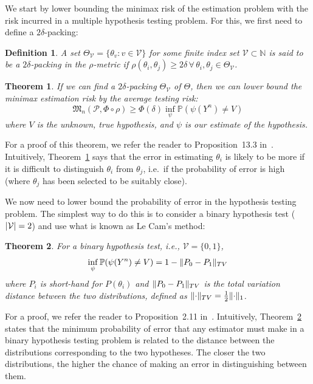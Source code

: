 \documentclass[conference]{IEEEtran}
\DeclarePairedDelimiter\abs{\lvert}{\rvert}
\DeclarePairedDelimiter\norm{\lVert}{\rVert}
\newcommand{\Phiorho}{\Phi\!\circ\!\rho}
\newtheorem{theorem}{Theorem}
\newtheorem{definition}{Definition}
\begin{document}
We start by lower bounding the minimax risk of the estimation problem with the
risk incurred in a multiple hypothesis testing problem. For this, we first need
to define a $2\delta$-packing:%
\begin{definition}
	A set $\Theta_{\mathcal{V}} = \{ \theta_v : v \in \mathcal{V} \}$ for some
	finite index set $\mathcal{V} \subset \mathbb N$ is said to be a
	$2\delta$-packing in the $\rho$-metric if $\rho(\theta_i, \theta_j) \geq
	2\delta \, \forall \, \theta_i, \theta_j \in \Theta_{\mathcal{V}}$.
\end{definition}
\begin{theorem} \label{thm:est-to-testing}%
	If we can find a $2\delta$-packing $\Theta_{\mathcal{V}}$ of $\Theta$, then
	we can lower bound the minimax estimation risk by the average testing risk:
	\begin{equation}
		\mathfrak{M}_n(\mathcal{P}, \Phiorho) \geq \Phi(\delta) \inf_\psi \mathbb P (\psi(Y^n) \neq V)
	\end{equation}
	where $V$ is the unknown, true hypothesis, and $\psi$ is our estimate of
	the hypothesis.
\end{theorem}
For a proof of this theorem, we refer the reader to Proposition~13.3
in~\cite{Duchi2015Information}.  Intuitively, Theorem~\ref{thm:est-to-testing}
says that the error in estimating $\theta_i$ is likely to be more if it is
difficult to distinguish $\theta_i$ from $\theta_j$, i.e.\ if the probability
of error is high (where $\theta_j$ has been selected to be suitably close).

We now need to lower bound the probability of error in the hypothesis testing
problem. The simplest way to do this is to consider a binary hypothesis test
($\abs{\mathcal{V}} = 2$) and use what is known as Le Cam's method:
\begin{theorem} \label{thm:le-cam}
	For a binary hypothesis test, i.e., $\mathcal{V} = \{0, 1\}$,
	\begin{equation}
		\inf_\psi \mathbb P(\psi(Y^n) \neq V) = 1 - \norm{P_0 - P_1}_{TV}
	\end{equation}
	where $P_i$ is short-hand for $P(\theta_i)$ and $\norm{P_0 - P_1}_{TV}$ is
	the total variation distance between the two distributions, defined as
	$\norm{\cdot}_{TV} = \frac{1}{2} \norm{\cdot}_1$.
\end{theorem}
For a proof, we refer the reader to Proposition~2.11
in~\cite{Duchi2015Information}.  Intuitively, Theorem~\ref{thm:le-cam} states
that the minimum probability of error that any estimator must make in a binary
hypothesis testing problem is related to the distance between the distributions
corresponding to the two hypotheses. The closer the two distributions, the
higher the chance of making an error in distinguishing between them.
\end{document}
